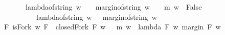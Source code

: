 \begin{isabellebody}
\ \ \ \ \ {\isasymand}\ \ \ {\isacharparenleft}lambda{\isacharunderscore}of{\isacharunderscore}string\ w\ {\isachargreater}\ {}\ {\isasymand}\ margin{\isacharunderscore}of{\isacharunderscore}string\ w\ {\isasymnoteq}\ {}\ {\isasymlongrightarrow}\ {\isacharparenleft}m\ {\isacharparenleft}w\ {\isacharat}\ {\isacharbrackleft}False{\isacharbrackright}{\isacharparenright}\ \isanewline
\ \ \ \ \ \ \ \ \ \ {\isacharequal}\ {\isacharparenleft}lambda{\isacharunderscore}of{\isacharunderscore}string\ w\ {\isacharminus}\ {}{\isacharcomma}\ margin{\isacharunderscore}of{\isacharunderscore}string\ w\ {\isacharminus}\ {}{\isacharparenright}{\isacharparenright}{\isacharparenright}{\isacharparenright}{\isacharparenright}\ \isanewline
{\isasymand}\ {\isacharparenleft}{\isasymexists}\ F{\isachardot}\ {\isacharparenleft}isFork\ w\ F\ {\isasymand}\ closedFork\ F\ w\ \ {\isasymand}\ {\isacharparenleft}m\ w\ {\isacharequal}\ {\isacharparenleft}lambda\ F\ w{\isacharcomma}\ margin\ F\ w{\isacharparenright}{\isacharparenright}{\isacharparenright}{\isacharparenright}{\isacharparenright}{\isachardoublequoteclose}\isanewline
%
\isadelimproof
\ \ %
\endisadelimproof
%
\isatagproof
{}\isamarkupfalse%
%
\endisatagproof
{\isafoldproof}%
%
\isadelimproof
\isanewline
%
\endisadelimproof
%
\isadelimtheory
\ \ \ \ \isanewline
%
\endisadelimtheory
%
\isatagtheory
{}\isamarkupfalse%
%
\endisatagtheory
{\isafoldtheory}%
%
\isadelimtheory
%
\endisadelimtheory
%
\end{isabellebody}%
